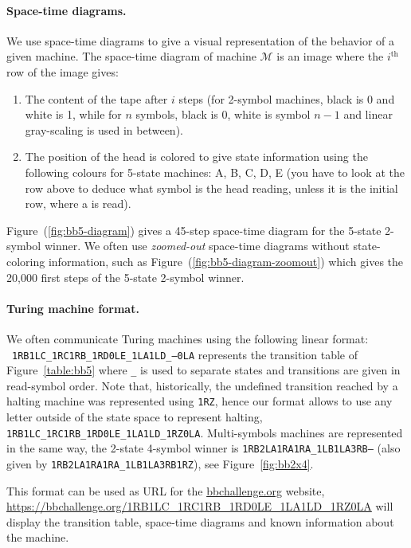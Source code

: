 \paragraph*{Space-time diagrams.} We use space-time diagrams to give a visual representation of the behavior of a given machine. The space-time diagram of machine $\mathcal{M}$ is an image where the $i^\text{th}$ row of the image gives:
\begin{enumerate}
    \item The content of the tape after $i$ steps (for 2-symbol machines, black is 0 and white is 1, while for $n$ symbols, black is 0, white is symbol $n-1$ and linear gray-scaling is used in between).
    \item The position of the head is colored to give state information using the following colours for 5-state machines: \textcolor{colorA}{A},  \textcolor{colorB}{B},  \textcolor{colorC}{C},  \textcolor{colorD}{D},  \textcolor{colorE}{E} (you have to look at the row above to deduce what symbol is the head reading, unless it is the initial row, where a \szero is read).
\end{enumerate}

Figure~(\ref{fig:bb5-diagram}) gives a 45-step space-time diagram for the 5-state 2-symbol \BBfull winner. We often use \textit{zoomed-out} space-time diagrams without state-coloring information, such as Figure~(\ref{fig:bb5-diagram-zoomout}) which gives the 20,000 first steps of the 5-state 2-symbol \BBfull winner.


\paragraph*{Turing machine format.} We often communicate Turing machines using the following linear format: \\ \texttt{1RB1LC\_1RC1RB\_1RD0LE\_1LA1LD\_---0LA} represents the transition table of Figure~\ref{table:bb5} where \texttt{\_} is used to separate states and transitions are given in read-symbol order. Note that, historically, the undefined transition reached by a halting machine was represented using \texttt{1RZ}, hence our format allows to use any letter outside of the state space to represent halting, \eg \texttt{1RB1LC\_1RC1RB\_1RD0LE\_1LA1LD\_1RZ0LA}. Multi-symbols machines are represented in the same way, \eg the 2-state 4-symbol \BBfull winner is \texttt{1RB2LA1RA1RA\_1LB1LA3RB---} (also given by \texttt{1RB2LA1RA1RA\_1LB1LA3RB1RZ}), see Figure~\ref{fig:bb2x4}.

This format can be used as URL for the \url{bbchallenge.org} website, \eg \url{https://bbchallenge.org/1RB1LC\_1RC1RB\_1RD0LE\_1LA1LD\_1RZ0LA} will display the transition table, space-time diagrams and known information about the machine.

